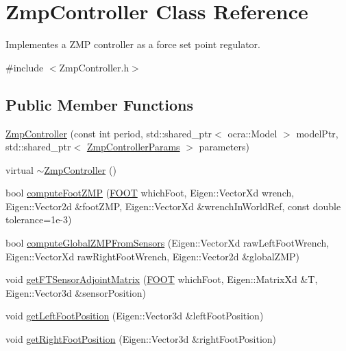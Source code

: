 \hypertarget{classZmpController}{\section{\-Zmp\-Controller \-Class \-Reference}
\label{classZmpController}
}


\-Implementes a \-Z\-M\-P controller as a force set point regulator.  




{\ttfamily \#include $<$\-Zmp\-Controller.\-h$>$}

\subsection*{\-Public \-Member \-Functions}
\begin{DoxyCompactItemize}
\item 
\hyperlink{classZmpController_a4c47608f6d62b6b490808816879c01b7}{\-Zmp\-Controller} (const int period, std\-::shared\-\_\-ptr$<$ ocra\-::\-Model $>$ model\-Ptr, std\-::shared\-\_\-ptr$<$ \hyperlink{structZmpControllerParams}{\-Zmp\-Controller\-Params} $>$ parameters)
\item 
virtual \hyperlink{classZmpController_af308a70e70cfe9a1e9569606da8b1739}{$\sim$\-Zmp\-Controller} ()
\item 
bool \hyperlink{classZmpController_a6fd41771d83a31bd190f4031f82649e0}{compute\-Foot\-Z\-M\-P} (\hyperlink{utils_8h_a4b6a8e135f90bd56e5a57a60efb42529}{\-F\-O\-O\-T} which\-Foot, \-Eigen\-::\-Vector\-Xd wrench, \-Eigen\-::\-Vector2d \&foot\-Z\-M\-P, \-Eigen\-::\-Vector\-Xd \&wrench\-In\-World\-Ref, const double tolerance=1e-\/3)
\item 
bool \hyperlink{classZmpController_aae5cc381a922206dad10ba2d425992ce}{compute\-Global\-Z\-M\-P\-From\-Sensors} (\-Eigen\-::\-Vector\-Xd raw\-Left\-Foot\-Wrench, \-Eigen\-::\-Vector\-Xd raw\-Right\-Foot\-Wrench, \-Eigen\-::\-Vector2d \&global\-Z\-M\-P)
\item 
void \hyperlink{classZmpController_aad272bd33de6fad489ea99618a7e9afa}{get\-F\-T\-Sensor\-Adjoint\-Matrix} (\hyperlink{utils_8h_a4b6a8e135f90bd56e5a57a60efb42529}{\-F\-O\-O\-T} which\-Foot, \-Eigen\-::\-Matrix\-Xd \&\-T, \-Eigen\-::\-Vector3d \&sensor\-Position)
\item 
void \hyperlink{classZmpController_ac8e821f72c79fe86102f02c4c155ad30}{get\-Left\-Foot\-Position} (\-Eigen\-::\-Vector3d \&left\-Foot\-Position)
\item 
void \hyperlink{classZmpController_a815cd495f657cbd93c25610d24982e8c}{get\-Right\-Foot\-Position} (\-Eigen\-::\-Vector3d \&right\-Foot\-Position)

\end{DoxyCompactItemize}
